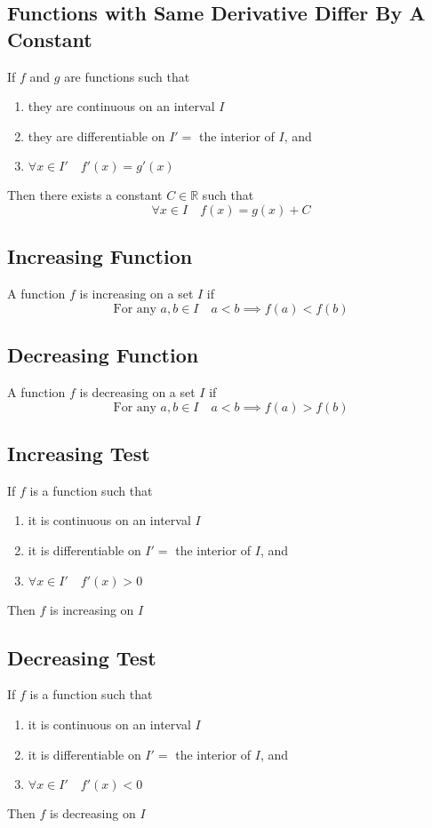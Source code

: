 \documentclass[../ma2002_notes.tex]{subfiles}
\begin{document}
\subsection{Functions with Same Derivative Differ By A Constant}
If \(f\) and \(g\) are functions such that
\begin{enumerate}
	\item they are continuous on an interval \(I\)
	\item they are differentiable on \(I'=\) the interior of \(I\), and
	\item \(\forall x\in I'\quad f'(x)=g'(x)\)
\end{enumerate}
Then there exists a constant \(C\in\mathbb{R}\) such that
\[\forall x\in I\quad f(x)=g(x)+C\]

\subsection{Increasing Function}
A function \(f\) is increasing on a set \(I\) if
\[\text{For any } a,b\in I\quad a<b\implies f(a)<f(b)\]

\subsection{Decreasing Function}
A function \(f\) is decreasing on a set \(I\) if
\[\text{For any } a,b\in I\quad a<b\implies f(a)>f(b)\]

\subsection{Increasing Test}
If \(f\) is a function such that
\begin{enumerate}
	\item it is continuous on an interval \(I\)
	\item it is differentiable on \(I'=\) the interior of \(I\), and
	\item \(\forall x\in I'\quad f'(x)>0\)
\end{enumerate}
Then \(f\) is increasing on \(I\)

\subsection{Decreasing Test}
If \(f\) is a function such that
\begin{enumerate}
	\item it is continuous on an interval \(I\)
	\item it is differentiable on \(I'=\) the interior of \(I\), and
	\item \(\forall x\in I'\quad f'(x)<0\)
\end{enumerate}
Then \(f\) is decreasing on \(I\)
\end{document}
